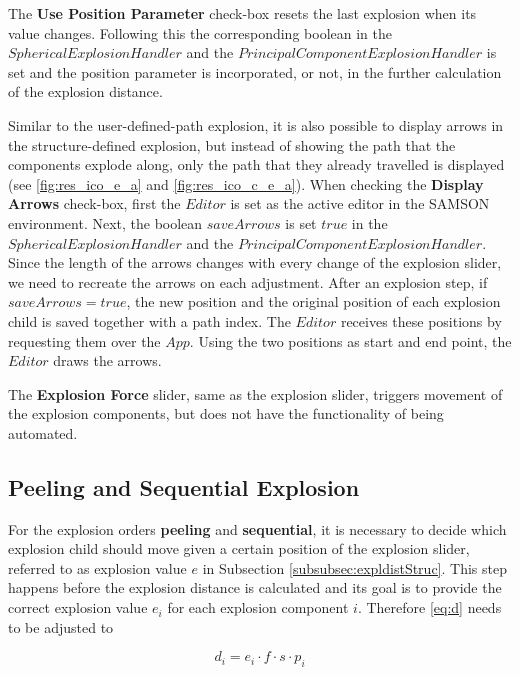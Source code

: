 \documentclass[draft,final]{vutinfth} %
\begin{document}
\par The \textbf{Use Position Parameter} check-box resets the last explosion when its value changes. Following this the corresponding boolean in the $SphericalExplosionHandler$ and the $PrincipalComponentExplosionHandler$ is set and the position parameter is incorporated, or not, in the further calculation of the explosion distance.

\par Similar to the user-defined-path explosion, it is also possible to display arrows in the structure-defined explosion, but instead of showing the path that the components explode along, only the path that they already travelled is displayed (see \autoref{fig:res_ico_e_a} and \autoref{fig:res_ico_c_e_a}). When checking the \textbf{Display Arrows} check-box, first the $Editor$ is set as the active editor in the SAMSON environment. Next, the boolean $saveArrows$ is set $true$ in the $SphericalExplosionHandler$ and the $PrincipalComponentExplosionHandler$. 
Since the length of the arrows changes with every change of the explosion slider, we need to recreate the arrows on each adjustment. After an explosion step, if $saveArrows = true$, the new position and the original position of each explosion child is saved together with a path index. The $Editor$ receives these positions by requesting them over the $App$. Using the two positions as start and end point, the $Editor$ draws the arrows.

\par The \textbf{Explosion Force} slider, same as the explosion slider, triggers movement of the explosion components, but does not have the functionality of being automated.

\subsection{Peeling and Sequential Explosion}
\label{subsec:psExpl}

For the explosion orders \textbf{peeling} and \textbf{sequential}, it is necessary to decide which explosion child should move given a certain position of the explosion slider, referred to as explosion value $e$ in Subsection \ref{subsubsec:expldistStruc}. This step happens before the explosion distance is calculated and its goal is to provide the correct explosion value $e_i$ for each explosion component $i$. Therefore \autoref{eq:d} needs to be adjusted to

\begin{equation}
\label{eq_d2}
d_i = e_i \cdot f \cdot s \cdot p_i
\end{equation}
\end{document}
